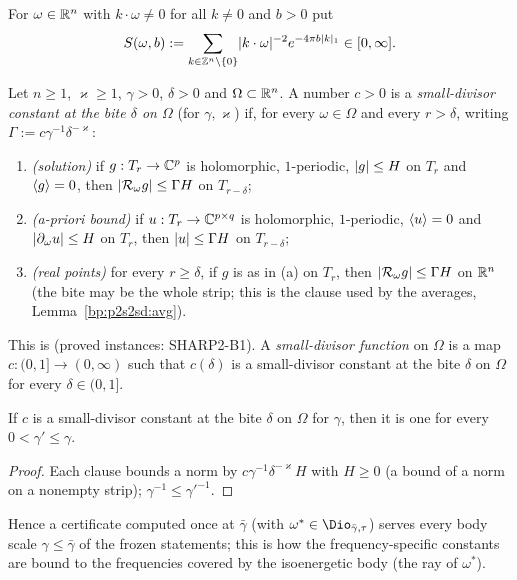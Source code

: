 For $\omega\in\mathbb{R}^n$ with $k\cdot\omega\ne0$ for all $k\ne0$ and $b>0$ put
\[
S(\omega,b):=\sum_{k\in\mathbb{Z}^n\setminus\{0\}}\lvert k\cdot\omega\rvert^{-2}e^{-4\pi b\lvert k\rvert_1}\in[0,\infty].
\]

\begin{definition}\label{bp:p2s2sd:const}
Let $n\ge1$, $\varkappa\ge1$, $\gamma>0$, $\delta>0$ and $\Omega\subset\mathbb{R}^n$. A number $c>0$ is a \emph{small-divisor constant
at the bite $\delta$ on $\Omega$} (for $\gamma,\varkappa$) if, for every $\omega\in\Omega$ and every $r>\delta$, writing
$\Gamma:=c\gamma^{-1}\delta^{-\varkappa}$:
\begin{enumerate}[label=(\alph*)]
\item \emph{(solution)} if $g:T_r\to\mathbb{C}^p$ is holomorphic, $1$-periodic, $\lvert g\rvert\le H$ on $T_r$ and $\langle g\rangle=0$, then
  $\lvert \mathcal R_\omega g\rvert\le\Gamma H$ on $T_{r-\delta}$;
\item \emph{(a-priori bound)} if $u:T_r\to\mathbb{C}^{p\times q}$ is holomorphic, $1$-periodic, $\langle u\rangle=0$ and $\lvert \partial_\omega u\rvert\le H$
  on $T_r$, then $\lvert u\rvert\le\Gamma H$ on $T_{r-\delta}$;
\item \emph{(real points)} for every $r\ge\delta$, if $g$ is as in (a) on $T_r$, then $\lvert \mathcal R_\omega g\rvert\le\Gamma H$ on $\mathbb{R}^n$ (the bite may be
  the whole strip; this is the clause used by the averages, Lemma~\ref{bp:p2s2sd:avg}).
\end{enumerate}
This is  (proved instances: SHARP2-B1).
A \emph{small-divisor function} on $\Omega$ is a map $c:(0,1]\to(0,\infty)$ such that $c(\delta)$ is a small-divisor constant at the bite
$\delta$ on $\Omega$ for every $\delta\in(0,1]$.
\end{definition}

\begin{lemma}\label{bp:p2s2sd:gamma-mono}
If $c$ is a small-divisor constant at the bite $\delta$ on $\Omega$ for $\gamma$, then it is one for every $0<\gamma'\le\gamma$.
\end{lemma}

\begin{proof}
\label{step:p2s2sd:gm}
Each clause bounds a norm by $c\gamma^{-1}\delta^{-\varkappa}H$ with $H\ge0$ (a bound of a norm on a nonempty strip); $\gamma^{-1}\le\gamma'^{-1}$.
\end{proof}
Hence a certificate computed once at $\bar\gamma$ (with $\omega^*\in\Dio_{\bar\gamma,\tau}$) serves every body scale $\gamma\le\bar\gamma$ of the frozen
statements; this is how the frequency-specific constants are bound to the frequencies covered by the isoenergetic body (the ray of $\omega^*$).

